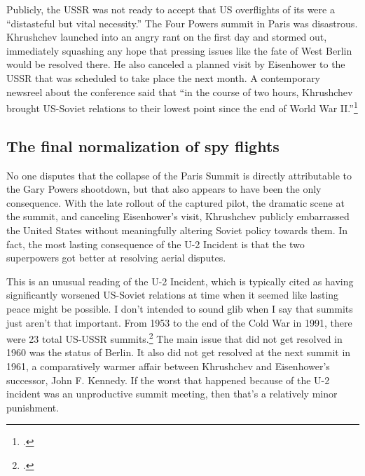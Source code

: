 \documentclass{report}
\begin{document}
\begin{refsegment}
Publicly, the USSR was not ready to accept that US overflights of its were a ``distasteful but vital necessity.'' The Four Powers summit in Paris was disastrous. Khrushchev launched into an angry rant on the first day and stormed out, immediately squashing any hope that pressing issues like the fate of West Berlin would be resolved there. He also canceled a planned visit by Eisenhower to the USSR that was scheduled to take place the next month. A contemporary newsreel about the conference said that ``in the course of two hours, Khrushchev brought US-Soviet relations to their lowest point since the end of World War II.''\footcite{universal_studios_summit_1960}

\subsection{The final normalization of spy flights}
No one disputes that the collapse of the Paris Summit is directly attributable to the Gary Powers shootdown, but that also appears to have been the only consequence. With the late rollout of the captured pilot, the dramatic scene at the summit, and canceling Eisenhower's visit, Khrushchev publicly embarrassed the United States without meaningfully altering Soviet policy towards them. In fact, the most lasting consequence of the U-2 Incident is that the two superpowers got better at resolving aerial disputes.

This is an unusual reading of the U-2 Incident, which is typically cited as having significantly worsened US-Soviet relations at time when it seemed like lasting peace might be possible. I don't intended to sound glib when I say that summits just aren't that important. From 1953 to the end of the Cold War in 1991, there were 23 total US-USSR summits.\footcite{fain_chronology_2011} The main issue that did not get resolved in 1960 was the status of Berlin. It also did not get resolved at the next summit in 1961, a comparatively warmer affair between Khrushchev and Eisenhower's successor, John F. Kennedy. If the worst that happened because of the U-2 incident was an unproductive summit meeting, then that's a relatively minor punishment.


\end{refsegment}
\end{document}

